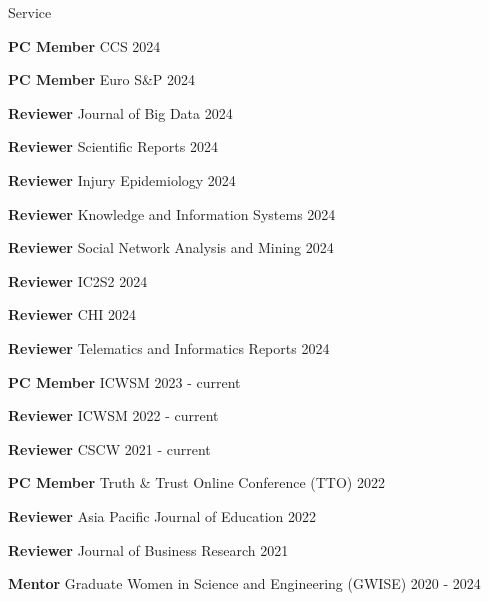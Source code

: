 \documentclass[12pt]{resume}
\begin{document}
\medskip

\begin{rSection}{Service}
\item \textbf{PC Member} CCS \hfill 2024
\item \textbf{PC Member} Euro S\&P \hfill 2024
\item \textbf{Reviewer} Journal of Big Data \hfill 2024
\item \textbf{Reviewer} Scientific Reports \hfill 2024
\item \textbf{Reviewer} Injury Epidemiology \hfill 2024
\item \textbf{Reviewer} Knowledge and Information Systems \hfill 2024
\item \textbf{Reviewer} Social Network Analysis and Mining \hfill 2024
\item \textbf{Reviewer} IC2S2 \hfill 2024
\item \textbf{Reviewer} CHI \hfill 2024
\item \textbf{Reviewer} Telematics and Informatics Reports \hfill 2024
\item \textbf{PC Member} ICWSM \hfill 2023 -  current
\item \textbf{Reviewer} ICWSM \hfill 2022 - current
\item \textbf{Reviewer} CSCW \hfill 2021 - current
\item \textbf{PC Member} Truth \& Trust Online Conference (TTO) \hfill 2022
\item \textbf{Reviewer} Asia Pacific Journal of Education \hfill 2022
\item \textbf{Reviewer} Journal of Business Research \hfill 2021
\item \textbf{Mentor} Graduate Women in Science and Engineering (GWISE) 
\hfill 2020 - 2024
\end{rSection}

\medskip
\end{document}
